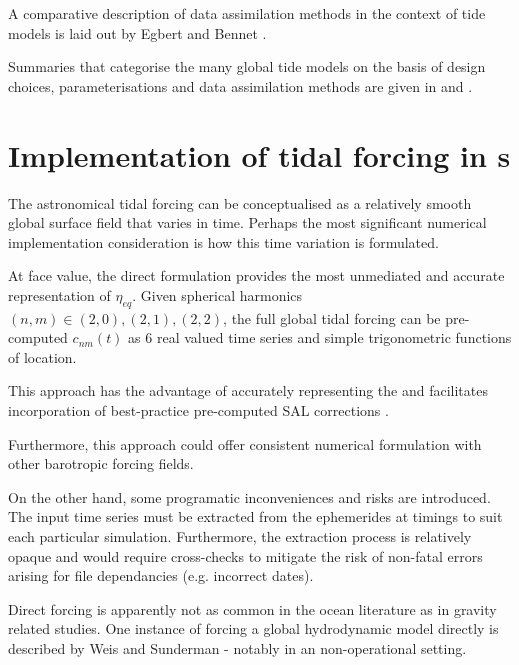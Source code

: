 A comparative description of data assimilation methods in the context of tide models is laid out by Egbert and Bennet \cite{Egbert:1996vr}.



Summaries that categorise the many global tide models on the basis of design choices, parameterisations and data assimilation methods are given in \cite{Ardalan:2008gs} and \cite{Matsumoto:2000tg}. \\



\section{Implementation of tidal forcing in \OGCM{}s }

The astronomical tidal forcing can be conceptualised as a relatively smooth global surface field that varies in time. 
Perhaps the most significant numerical implementation consideration is how this time variation is formulated.

At face value, the direct formulation provides the most unmediated and accurate representation of $\eta_{eq}$. Given spherical harmonics $(n,m) \in (2,0) , (2,1) , (2,2)$, the full global tidal forcing can be pre-computed $c_{nm}(t)$ as 6 real valued time series and simple trigonometric functions of location.

This approach has the advantage of accurately representing the \ATGP{} and facilitates incorporation of best-practice pre-computed SAL corrections \citep{Egbert:2002ug}. 

Furthermore, this approach could offer consistent numerical formulation with other barotropic forcing fields.



On the other hand, some programatic inconveniences and risks are introduced. 
The input time series must be extracted from the ephemerides at timings to suit each particular simulation.  Furthermore, the extraction process is relatively opaque and would require cross-checks to mitigate the risk of non-fatal errors arising for file dependancies (e.g. incorrect dates).


Direct forcing is apparently not as common in the ocean literature as in gravity related studies.   
One instance of forcing a global hydrodynamic model directly is described by Weis and Sunderman \citep{Weis:2008ex} - notably in an non-operational setting.





